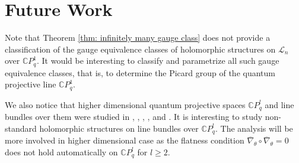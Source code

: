 \documentclass[12pt]{article}
\numberwithin{equation}{section}
\def\nb{\bar{\nabla}_\theta}
\def\nb{\overline{\nabla}_\theta}
\def\C{{\mathbb C}}
\def\L{\mathcal{L}}
\begin{document}
\section{Future Work}\label{section: future work}

Note that Theorem \ref{thm: infinitely many gauge class} does not provide a classification of the gauge equivalence classes of holomorphic structures on $\L_n$ over $\C P^1_q$. It would be interesting to classify and parametrize all such gauge equivalence classes, that is, to determine the Picard group of the quantum projective line $\C P^1_q$.

We also notice that higher dimensional quantum projective spaces $\C P^l_q$ and line bundles over them were  studied in \cite{d2008noncommutative}, \cite{d2010anti}, \cite{d2010dirac}, \cite{d2013geometry}, and \cite{khalkhali2011noncommutative}. It is interesting to study non-standard holomorphic structures on line bundles over $\C P^l_q$. The analysis will be more involved in higher dimensional case as the flatness condition $\nb\circ \nb=0$ does not hold automatically on $\C P^l_q$  for $l\geq 2$.






\end{document}
